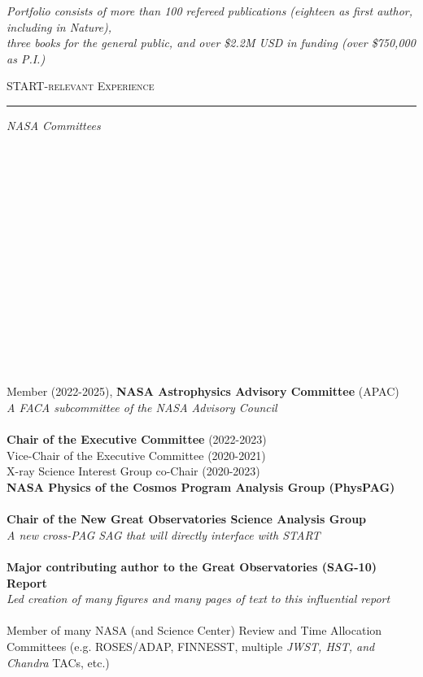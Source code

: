 \documentclass[11pt]{article}
\makeatletter
\def\vhrulefill#1{\leavevmode\leaders\hrule\@height#1\hfill \kern\z@}
\makeatother
\begin{document}
\begin{center}
\textit{Portfolio consists of more than 100 refereed publications (eighteen as first author, including in Nature), \\ three books for the general public, and over \$2.2M USD in funding (over \$750,000 as P.I.) }  \\
\end{center}


\clearpage




\textsc{START-relevant Experience} \vhrulefill{0.4pt}


\vspace{3mm}

\hspace{2.5mm} \parbox{1.5in}{\textit{NASA Committees}\\\\\\\\\\\\\\\\\\\\\\\\\\\\\\\\} \parbox{5.15in}{Member (2022-2025), \textbf{NASA Astrophysics Advisory Committee} (APAC)\\\textit{A FACA subcommittee of the NASA Advisory Council} \\\\\textbf{Chair of the Executive Committee} (2022-2023) \\ Vice-Chair of the Executive Committee (2020-2021) \\ X-ray Science Interest Group co-Chair (2020-2023) \\ \textbf{NASA Physics of the Cosmos Program Analysis Group (PhysPAG)} \\\\ \textbf{Chair of the New Great Observatories Science Analysis Group} \\ \textit{A new cross-PAG SAG that will directly interface with START}\\\\\textbf{Major contributing author to the Great Observatories (SAG-10) Report} \\\textit{Led creation of many figures and many pages of text to this influential report} \\\\ Member of many NASA (and Science Center) Review and Time Allocation Committees (e.g. ROSES/ADAP, FINNESST, multiple \textit{JWST, HST, and Chandra} TACs, etc.)}\\
\end{document}
